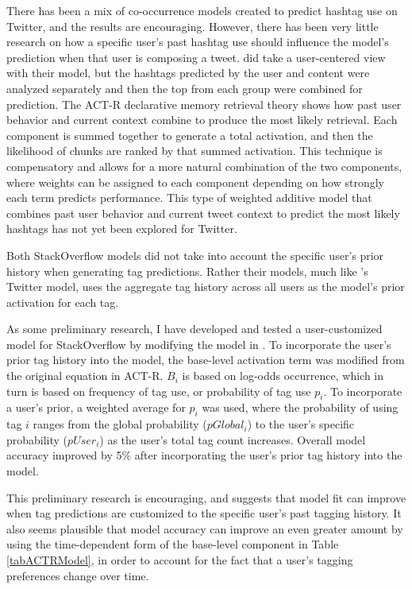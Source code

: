 \documentclass[man,floatsintext,donotrepeattitle]{apa6}
\begin{document}
There has been a mix of co-occurrence models created to predict hashtag use on Twitter, and the results are encouraging.
However, there has been very little research on how a specific user's past hashtag use should influence the model's prediction when that user is composing a tweet.
\textcite{Kywe2012} did take a user-centered view with their model, but the hashtags predicted by the user and content were analyzed separately and then the top from each group were combined for prediction.
The ACT-R declarative memory retrieval theory shows how past user behavior and current context combine to produce the most likely retrieval.
Each component is summed together to generate a total activation, and then the likelihood of chunks are ranked by that summed activation.
This technique is compensatory and allows for a more natural combination of the two components, where weights can be assigned to each component depending on how strongly each term predicts performance.
This type of weighted additive model that combines past user behavior and current tweet context to predict the most likely hashtags has not yet been explored for Twitter.

Both StackOverflow models \parencites{Stanley2013,Kuo2011} did not take into account the specific user's prior history when generating tag predictions.
Rather their models, much like \textcite{Mazzia2009}'s Twitter model, uses the aggregate tag history across all users as the model's prior activation for each tag.

As some preliminary research, I have developed and tested a user-customized model for StackOverflow by modifying the model in \textcite{Stanley2013}.
To incorporate the user's prior tag history into the model, the base-level activation term was modified from the original equation in ACT-R.
$B_{i}$ is based on log-odds occurrence, which in turn is based on frequency of tag use, or probability of tag use $p_{i}$.
To incorporate a user's prior, a weighted average for $p_{i}$ was used,
where the probability of using tag $i$ ranges from the global probability ($pGlobal_{i}$) to the user's specific probability ($pUser_{i}$) as the user's total tag count increases.
Overall model accuracy improved by 5\% after incorporating the user's prior tag history into the model.

This preliminary research is encouraging, and suggests that model fit can improve when tag predictions are customized to the specific user's past tagging history.
It also seems plausible that model accuracy can improve an even greater amount by using the time-dependent form of the base-level component in Table \ref{tabACTRModel},
in order to account for the fact that a user's tagging preferences change over time.
\end{document}
